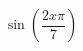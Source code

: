 \documentclass[preview]{standalone}
\begin{document}
\begin{align*}
\sin\left(\dfrac{2x\pi}{7}\right)
\end{align*}
\end{document}
